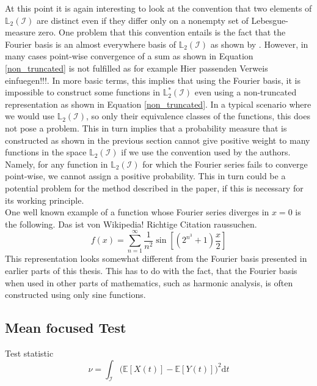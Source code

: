 \documentclass[12pt, a4paper]{article}
\theoremstyle{MAstyle} \newtheorem{assumption}{Assumption}[section]
\theoremstyle{MAstyle} \newtheorem{definition}{Definition}[section]
\theoremstyle{MAstyle} \newtheorem{theorem}{Theorem}[section]
\begin{document}
			At this point it is again interesting to look at the convention that two elements of $\mathbb{L}_2(\mathcal{I})$ are distinct even if they differ only on a nonempty set of Lebesgue-measure zero. One problem that this convention entails is the fact that the Fourier basis is an almost everywhere basis of $\mathbb{L}_2\left(\mathcal{I}\right)$ as shown by \cite{carleson_convergence_1966}. However, in many cases point-wise convergence of a sum as shown in Equation \ref{non_truncated} is not fulfilled as for example {\color{red} Hier passenden Verweis einfuegen!!!}. In more basic terms, this implies that using the Fourier basis, it is impossible to construct some functions in $\mathbb{L}^{*}_2\left(\mathcal{I}\right)$ even using a non-truncated representation as shown in Equation \ref{non_truncated}.			
			In a typical scenario where we would use $\mathbb{L}_2\left(\mathcal{I}\right)$, so only their equivalence classes of the functions, this does not pose a problem. 
			This in turn implies that a probability measure that is constructed as shown in the previous section cannot give positive weight to many functions in the space $\mathbb{L}_2(\mathcal{I})$ if we use the convention used by the authors. Namely, for any function in $\mathbb{L}_2(\mathcal{I})$ for which the Fourier series fails to converge point-wise, we cannot assign a positive probability. This in turn could be a potential problem for the method described in the paper, if this is necessary for its working principle.\\
			
			One well known example of a function whose Fourier series diverges in $x=0$ is the following. {\color{red} Das ist von Wikipedia! Richtige Citation raussuchen.}
			\begin{equation}
				f(x) = \sum_{n = 1}^{\infty} \frac{1}{n^2}\sin\left[\left(2^{n^3} + 1\right)\frac{x}{2}\right]
			\end{equation}
			This representation looks somewhat different from the Fourier basis presented in earlier parts of this thesis. This has to do with the fact, that the Fourier basis when used in other parts of mathematics, such as harmonic analysis, is often constructed using only sine functions.
			
		\subsection{Mean focused Test}
			
			Test statistic
			\begin{equation}
				\nu = \int_{\mathcal{I}} \big(\mathbb{E}\left[X(t)\right] - \mathbb{E}\left[Y(t)\right]\big)^2 \mathrm{d}t
			\end{equation}
		
\end{document}
